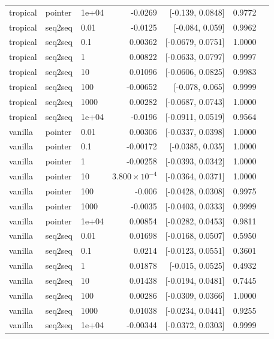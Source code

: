 \documentclass[10pt]{article}
\begin{document}
{\begin{longtable}{lllrrrl}
tropical & pointer & 1e+04 & -0.0269 & [-0.139, 0.0848] & 0.9772 & \\
tropical & seq2seq & 0.01 & -0.0125 & [-0.084, 0.059] & 0.9962 & \\
tropical & seq2seq & 0.1 & 0.00362 & [-0.0679, 0.0751] & 1.0000 & \\
tropical & seq2seq & 1 & 0.00822 & [-0.0633, 0.0797] & 0.9997 & \\
tropical & seq2seq & 10 & 0.01096 & [-0.0606, 0.0825] & 0.9983 & \\
tropical & seq2seq & 100 & -0.00652 & [-0.078, 0.065] & 0.9999 & \\
tropical & seq2seq & 1000 & 0.00282 & [-0.0687, 0.0743] & 1.0000 & \\
tropical & seq2seq & 1e+04 & -0.0196 & [-0.0911, 0.0519] & 0.9564 & \\
vanilla & pointer & 0.01 & 0.00306 & [-0.0337, 0.0398] & 1.0000 & \\
vanilla & pointer & 0.1 & -0.00172 & [-0.0385, 0.035] & 1.0000 & \\
vanilla & pointer & 1 & -0.00258 & [-0.0393, 0.0342] & 1.0000 & \\
vanilla & pointer & 10 & $3.800\times10^{-4}$ & [-0.0364, 0.0371] & 1.0000 & \\
vanilla & pointer & 100 & -0.006 & [-0.0428, 0.0308] & 0.9975 & \\
vanilla & pointer & 1000 & -0.0035 & [-0.0403, 0.0333] & 0.9999 & \\
vanilla & pointer & 1e+04 & 0.00854 & [-0.0282, 0.0453] & 0.9811 & \\
vanilla & seq2seq & 0.01 & 0.01698 & [-0.0168, 0.0507] & 0.5950 & \\
vanilla & seq2seq & 0.1 & 0.0214 & [-0.0123, 0.0551] & 0.3601 & \\
vanilla & seq2seq & 1 & 0.01878 & [-0.015, 0.0525] & 0.4932 & \\
vanilla & seq2seq & 10 & 0.01438 & [-0.0194, 0.0481] & 0.7445 & \\
vanilla & seq2seq & 100 & 0.00286 & [-0.0309, 0.0366] & 1.0000 & \\
vanilla & seq2seq & 1000 & 0.01038 & [-0.0234, 0.0441] & 0.9255 & \\
vanilla & seq2seq & 1e+04 & -0.00344 & [-0.0372, 0.0303] & 0.9999 & \\
\bottomrule
\end{longtable}
}
\end{document}
